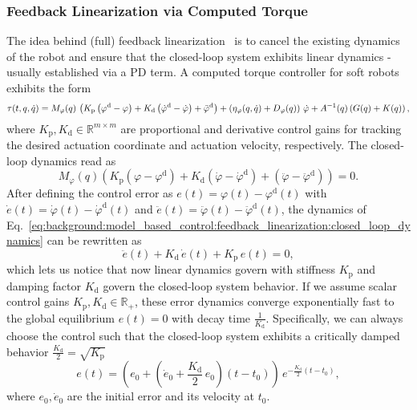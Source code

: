 \subsubsection{Feedback Linearization via Computed Torque}
The idea behind (full) feedback linearization~\citep{slotine1987on, spong2020robot} is to 
cancel the existing dynamics of the robot and ensure that the closed-loop system exhibits linear dynamics - usually established via a PD term. A computed torque controller for soft robots exhibits the form
\begin{equation}\small
    \tau(t,q,\dot{q}) = M_{\varphi}(q) \, \left (K_\mathrm{p} \left (\varphi^\mathrm{d} - \varphi \right ) + K_\mathrm{d} \left (\dot{\varphi}^\mathrm{d} - \dot{\varphi} \right ) + \ddot{\varphi}^\mathrm{d}\right ) + \left ( \eta_{\varphi}(q,\dot{q}) + D_\varphi(q) \right ) \, \dot{\varphi} + A^{-1}(q) \left ( G(q) + K(q) \right ),
\end{equation}
where $K_\mathrm{p}, K_\mathrm{d} \in \mathbb{R}^{m \times m}$ are proportional and derivative control gains for tracking the desired actuation coordinate and actuation velocity, respectively. 
The closed-loop dynamics read as
\begin{equation}\label{eq:background:model_based_control:feedback_linearization:closed_loop_dynamics}
    M_{\varphi}(q) \left (K_\mathrm{p} \left (\varphi - \varphi^\mathrm{d} \right ) + K_\mathrm{d} \left (\dot{\varphi} - \dot{\varphi}^\mathrm{d} \right ) + \left ( \ddot{\varphi} - \ddot{\varphi}^\mathrm{d} \right ) \right ) = 0.
\end{equation}
After defining the control error as $e(t) = \varphi(t) - \varphi^\mathrm{d}(t)$ with $\dot{e}(t) = \dot{\varphi}(t) - \dot{\varphi}^\mathrm{d}(t)$ and $\ddot{e}(t) = \ddot{\varphi}(t) - \ddot{\varphi}^\mathrm{d}(t)$, the dynamics of Eq.~\ref{eq:background:model_based_control:feedback_linearization:closed_loop_dynamics} can be rewritten as
\begin{equation}
    \ddot{e}(t) + K_\mathrm{d} \, \dot{e}(t) + K_\mathrm{p} \, e(t) = 0,
\end{equation}
which lets us notice that now linear dynamics govern with stiffness $K_\mathrm{p}$ and damping factor $K_\mathrm{d}$ govern the closed-loop system behavior.
If we assume scalar control gains $K_\mathrm{p}, K_\mathrm{d} \in \mathbb{R}_+$, these error dynamics converge exponentially fast to the global equilibrium $e(t) = 0$ with decay time $\frac{1}{K_\mathrm{d}}$. Specifically, we can always choose the control such that the closed-loop system exhibits a critically damped behavior $\frac{K_\mathrm{d}}{2} = \sqrt{K_\mathrm{p}}$
\begin{equation}\label{eq:background:model_based_control:feedback_linearization:error_evolution_closed_form}
    e(t) = \left ( e_0 + \left ( \dot{e}_0 + \frac{K_\mathrm{d}}{2} \, e_0 \right ) (t-t_0) \right ) \, e^{-\frac{K_\mathrm{d}}{2} (t - t_0)},
\end{equation}
where $e_0, \dot{e}_0$ are the initial error and its velocity at $t_0$.

